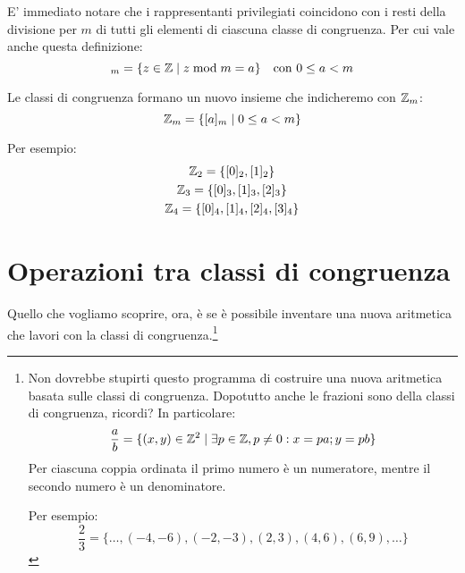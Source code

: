 E' immediato notare che i rappresentanti privilegiati coincidono con i resti della divisione per $m$ di tutti gli elementi di ciascuna classe di congruenza. Per cui vale anche questa definizione:
\begin{equation*}
    [a]_m = \{z \in \Z \mid z \modulo m = a\} \quad \text{con } 0 \le a < m
\end{equation*}

Le classi di congruenza formano un nuovo insieme che indicheremo con $ \mathbb{Z} _m$:
\begin{equation*}
     \mathbb{Z} _m = \{ [a]_m \mid 0 \le a < m \}
\end{equation*}

Per esempio:
\begin{gather*}
     \mathbb{Z} _2 = \{[0]_2, [1]_2\} \\
     \mathbb{Z} _3 = \{[0]_3, [1]_3, [2]_3\} \\
     \mathbb{Z} _4 = \{[0]_4, [1]_4, [2]_4, [3]_4\} \\
\end{gather*}

\section{Operazioni tra classi di congruenza}

Quello che vogliamo scoprire, ora, è se è possibile inventare una nuova aritmetica che lavori con la classi di congruenza.\footnote{Non dovrebbe stupirti questo programma di costruire una nuova aritmetica basata sulle classi di congruenza. Dopotutto anche le frazioni sono della classi di congruenza, ricordi? In particolare:
\begin{equation*}
    \dfrac{a}{b} = \{ (x, y) \in  \mathbb{Z} ^2 \mid \exists p \in  \mathbb{Z} , p \ne 0: x = pa; y = pb\}
\end{equation*}
Per ciascuna coppia ordinata il primo numero è un numeratore, mentre il secondo numero è un denominatore.

Per esempio:
\begin{equation*}
    \dfrac{2}{3} = \{ \dots, (-4, -6), (-2,-3), (2, 3), (4, 6), (6, 9), \dots \}
\end{equation*}
}

